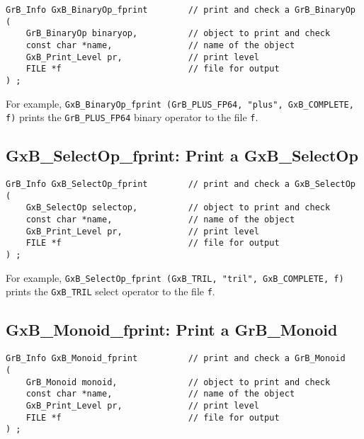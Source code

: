 \documentclass[12pt]{article}
\begin{document}
\begin{mdframed}[userdefinedwidth=6in]
{\footnotesize
\begin{verbatim}
GrB_Info GxB_BinaryOp_fprint        // print and check a GrB_BinaryOp
(
    GrB_BinaryOp binaryop,          // object to print and check
    const char *name,               // name of the object
    GxB_Print_Level pr,             // print level
    FILE *f                         // file for output
) ;
\end{verbatim} } \end{mdframed}

For example,
\verb'GxB_BinaryOp_fprint (GrB_PLUS_FP64, "plus", GxB_COMPLETE, f)' prints the
\verb'GrB_PLUS_FP64' binary operator to the file \verb'f'.


\subsection{{\sf GxB\_SelectOp\_fprint:} Print a {\sf GxB\_SelectOp}}

\begin{mdframed}[userdefinedwidth=6in]
{\footnotesize
\begin{verbatim}
GrB_Info GxB_SelectOp_fprint        // print and check a GxB_SelectOp
(
    GxB_SelectOp selectop,          // object to print and check
    const char *name,               // name of the object
    GxB_Print_Level pr,             // print level
    FILE *f                         // file for output
) ;
\end{verbatim} } \end{mdframed}

For example,
\verb'GxB_SelectOp_fprint (GxB_TRIL, "tril", GxB_COMPLETE, f)' prints the
\verb'GxB_TRIL' select operator to the file \verb'f'.

\newpage
\subsection{{\sf GxB\_Monoid\_fprint:} Print a {\sf GrB\_Monoid}}

\begin{mdframed}[userdefinedwidth=6in]
{\footnotesize
\begin{verbatim}
GrB_Info GxB_Monoid_fprint          // print and check a GrB_Monoid
(
    GrB_Monoid monoid,              // object to print and check
    const char *name,               // name of the object
    GxB_Print_Level pr,             // print level
    FILE *f                         // file for output
) ;
\end{verbatim} } \end{mdframed}
\end{document}
